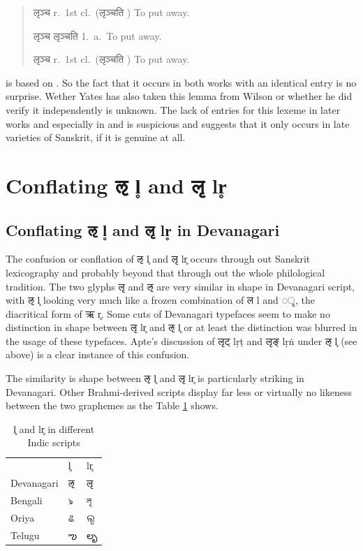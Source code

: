 \begin{quote}
{\devbfont लृञ्च} r.~1st cl.~({\devfont लृञ्चति} ) To put away. \citep[][p.~722]{wil}

{\devbfont लृञ्च} {\devfont लृञ्चति}  1.~a.~To put away. \citep[][p.~646]{yat}

{\devbfont लृञ्च} r.~1st cl.~({\devfont लृञ्चति} ) To put away. \citep[][p.~619]{shs}
\end{quote}

\citet{shs} is based on \citet{wil}. So the fact that it occurs in both works with an identical entry is no surprise. Wether Yates has also taken this lemma from Wilson or whether he did verify it independently is unknown. The lack of entries for this lexeme in later works and especially in \citet{pwg} and \citet{mw} is suspicious and suggests that it only occurs in late varieties of Sanskrit, if it is genuine at all.

\section{Conflating {\devhmfont ऌ} l̥ and {\devhmfont लृ} lr̥}
\subsection{Conflating {\devhmfont ऌ} l̥ and {\devhmfont लृ} lr̥ in Devanagari} 

The confusion or conflation of {\devfont ऌ} l̥  and {\devfont लृ} lr̥ occurs through out Sanskrit lexicography and probably beyond that through out the whole philological tradition. The two glyphs {\devfont लृ} and {\devfont ऌ} are very similar in shape in Devanagari script, with {\devfont ऌ} l̥ looking very much like a frozen combination of {\devfont ल} l and {\devfont ◌ृ}, the diacritical form of {\devfont ऋ} r̥. Some cuts of Devanagari typefaces seem to make no distinction in shape between  {\devfont लृ} lr̥ and {\devfont ऌ} l̥ or at least the distinction was blurred in the usage of these typefaces. Apte’s discussion of {\devfont लृट्} lṛṭ and {\devfont लृङ्} lṛṅ under {\devfont ऌ} l̥  (see above) is a clear instance of this confusion.

The similarity is shape between {\devfont ऌ} l̥ and {\devfont लृ} lr̥ is particularly striking in Devanagari. Other Brahmi-derived scripts display far less or virtually no likeness between the two graphemes as the Table \ref{tab:indic} shows. 

\begin{table}[!h]
\begin{center}
\begin{tabular}{lll}
&l̥&lr̥\\
Devanagari&{\devfont ऌ}&{\devfont लृ}\\
Bengali&{\bangfont ঌ}&{\bangfont লৃ}\\
Oriya&{\orifont ଌ}&{\orifont ଲୃ}\\
Telugu&{\telfont ఌ}&{\telfont లృ}\\
\end{tabular}
\end{center}
\caption[l̥ and lr̥ in different Indic scripts]{\label{tab:indic}l̥ and lr̥ in different Indic scripts}
\end{table}


